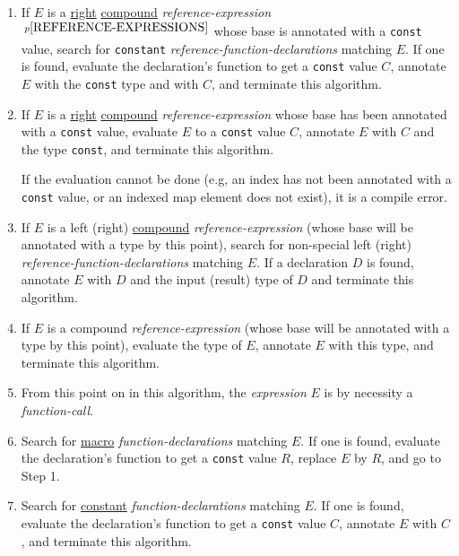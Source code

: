 \documentclass[12pt]{article}
\newcommand{\pagnote}[1]{$\,^{p\pageref{#1}}$}
\begin{document}
\begin{enumerate}
\item\label{CONSTANT-REFERENCE-FUNCTION-STEP}
If $E$ is a \underline{right} \underline{compound}
{\em reference-expression}\pagnote{REFERENCE-EXPRESSIONS} whose
base is annotated with a {\tt const} value, search for {\tt constant}
{\em reference-function-declarations} matching $E$.  If one is found,
evaluate the declaration's function to get a {\tt const} value $C$,
annotate $E$ with the {\tt const} type and with $C$,
and terminate this algorithm.

\item\label{CONSTANT-REFERENCE-STEP}
If $E$ is
a \underline{right} \underline{compound}
{\em reference-expression} whose base has been annotated with a {\tt const}
value,
evaluate $E$ to a {\tt const} value $C$, annotate $E$
with $C$ and the type {\tt const}, and terminate this algorithm.

If the evaluation cannot be done (e.g, an index has not been annotated
with a {\tt const} value, or an indexed map element does not exist),
it is a compile error.

\item\label{REFERENCE-FUNCTION-STEP}
If $E$ is a left (right) \underline{compound} {\em reference-expression}
(whose base will be annotated with a type by this point),
search for non-special left (right)
{\em reference-function-declarations} matching $E$.  If a declaration $D$
is found,
annotate $E$ with $D$ and the input (result) type of $D$ and terminate
this algorithm.

\item\label{REFERENCE-STEP}
If $E$ is
a compound {\em reference-expression}
(whose base will be annotated with a type by this point),
evaluate the type of $E$, annotate $E$ with this type, and
terminate this algorithm.

\item From this point on in this algorithm, the {\em expression} $E$
is by necessity a {\em function-call}.

\item\label{MACRO-FUNCTION-STEP}
Search for \underline{macro} {\em function-declarations}
matching $E$.  If one is found,
evaluate the declaration's function to get a {\tt const} value $R$,
replace $E$ by $R$, and go to Step 1.

\item\label{CONSTANT-FUNCTION-STEP}
Search for \underline{constant} {\em function-declarations}
matching $E$.  If one is found,
evaluate the declaration's function to get a {\tt const} value $C$,
annotate $E$ with $C$, and terminate this algorithm.


\end{enumerate}
\end{document}
